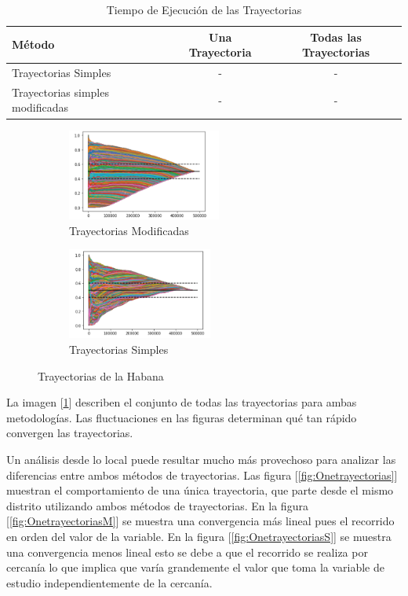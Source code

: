 \begin{table}[h!]
	\begin{center}
		\begin{tabular}{| l | c | c |}
			\hline
			Método & Una Trayectoria & Todas las Trayectorias \\ \hline
			Trayectorias Simples & - & - \\
			Trayectorias simples modificadas & - & - \\ \hline
		
		\end{tabular}
		\caption{Tiempo de Ejecución de las Trayectorias}
		\label{tab:resumenTrayectorias}
	\end{center}
\end{table}

\begin{figure}[h!]
	\centering
	\begin{subfigure}[b]{0.4\linewidth}
		\includegraphics[width=\linewidth, height=3cm]{Images/TrayecCon.png}
		\caption{Trayectorias Modificadas}
	\end{subfigure}
	\begin{subfigure}[b]{0.4\linewidth}
		\includegraphics[width=\linewidth, height=3cm]{Images/ValueTray.png}
		\caption{Trayectorias Simples}
	\end{subfigure}

	\caption{Trayectorias de la Habana}
	\label{fig:trayectorias}
\end{figure}

La imagen [\ref{fig:trayectorias}] describen el conjunto de todas las trayectorias para ambas metodologías. Las fluctuaciones en las figuras determinan qué tan rápido convergen las trayectorias.

\newpage

Un análisis desde lo local puede resultar mucho más provechoso para analizar las diferencias entre ambos métodos de trayectorias. Las figura [\ref{fig:Onetrayectorias}] muestran el comportamiento de una única trayectoria, que parte desde el mismo distrito utilizando ambos métodos de trayectorias. En la figura [\ref{fig:OnetrayectoriasM}] se muestra una convergencia más lineal pues el recorrido en orden del valor de la variable. En la figura [\ref{fig:OnetrayectoriasS}] se muestra una convergencia menos lineal esto se debe a que el recorrido se realiza por cercanía lo que implica que varía grandemente el valor que toma la variable de estudio independientemente de la cercanía.

